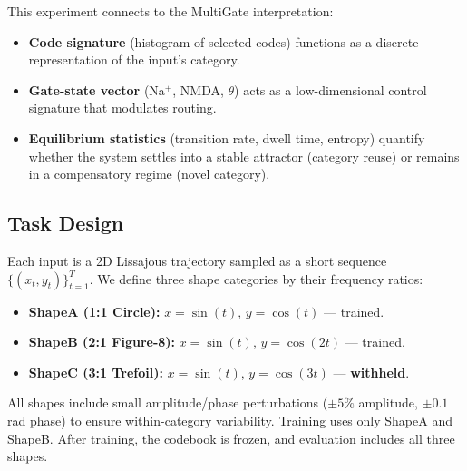 \documentclass{article}
\begin{document}
This experiment connects to the MultiGate interpretation:
\begin{itemize}
    \item \textbf{Code signature} (histogram of selected codes) functions as a discrete representation of the input's category.
    \item \textbf{Gate-state vector} (Na$^{+}$, NMDA, $\theta$) acts as a low-dimensional control signature that modulates routing.
    \item \textbf{Equilibrium statistics} (transition rate, dwell time, entropy) quantify whether the system settles into a stable attractor (category reuse) or remains in a compensatory regime (novel category).
\end{itemize}

\subsection{Task Design}
Each input is a 2D Lissajous trajectory sampled as a short sequence $\{(x_t, y_t)\}_{t=1}^{T}$.
We define three shape categories by their frequency ratios:
\begin{itemize}
    \item \textbf{ShapeA (1:1 Circle):} $x = \sin(t)$, $y = \cos(t)$ --- trained.
    \item \textbf{ShapeB (2:1 Figure-8):} $x = \sin(t)$, $y = \cos(2t)$ --- trained.
    \item \textbf{ShapeC (3:1 Trefoil):} $x = \sin(t)$, $y = \cos(3t)$ --- \textbf{withheld}.
\end{itemize}

All shapes include small amplitude/phase perturbations ($\pm 5\%$ amplitude, $\pm 0.1$ rad phase) to ensure within-category variability.
Training uses only ShapeA and ShapeB. After training, the codebook is frozen, and evaluation includes all three shapes.
\end{document}
